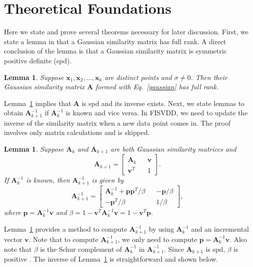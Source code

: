 \documentclass{article}
\newcommand{\eref}[1]{Eq.~\ref{#1}}
\newcommand{\lref}[1]{Lemma~\ref{#1}}
\newtheorem{lemma}[theorem]{Lemma}
\numberwithin{equation}{section}
\begin{document}
\section{Theoretical Foundations}\label{theorems}
Here we state and prove several theorems necessary for later discussion. First, we state a lemma in \citet{smola1998learning} that a Gaussian similarity matrix has full rank. A direct conclusion of the lemma is that a Gaussian similarity matrix is symmetric positive definite (spd).
\begin{lemma}\label{spd}
Suppose $\mathbf{x}_1,\mathbf{x}_2,\ldots,\mathbf{x}_k$ are distinct points and $\sigma\neq0$. Then their Gaussian similarity matrix $\mathbf{A}$ formed with \eref{gaussian} has full rank.
\end{lemma}
\lref{spd} implies that $\mathbf{A}$ is spd and its inverse exists. Next, we state lemmas to obtain $\mathbf{A}_{k+1}^{-1}$ if $\mathbf{A}_{k}^{-1}$ is known and vice versa. In FISVDD, we need to update the inverse of the similarity matrix when a new data point comes in. The proof involves only matrix calculations and is skipped.

\begin{lemma}\label{increinv}
Suppose $\mathbf{A}_k$ and $\mathbf{A}_{k+1}$ are both Gaussian similarity matrices and
\begin{equation}\label{vvec}
\mathbf{A}_{k+1} = \begin{bmatrix}
\mathbf{A}_k && \mathbf{v}\\
\mathbf{v}^T && 1
\end{bmatrix}.
\end{equation}
If $\mathbf{A}_k^{-1}$ is known, then $\mathbf{A}_{k+1}^{-1}$
is given by
\begin{equation}\label{ak+1inv}
\mathbf{A}_{k+1}^{-1} = \begin{bmatrix}
\mathbf{A}_k^{-1} + \mathbf{p}\mathbf{p}^T/\beta && -\mathbf{p}/\beta\\
-\mathbf{p}^T/\beta && 1/\beta
\end{bmatrix},
\end{equation}
where
$\mathbf{p} = \mathbf{A}_k^{-1}\mathbf{v}$ and $\beta = 1 - \mathbf{v}^T\mathbf{A}_k^{-1}\mathbf{v}=1-\mathbf{v}^T\mathbf{p}$.
\end{lemma}

\lref{increinv} provides a method to compute $\mathbf{A}_{k+1}^{-1}$ by using $\mathbf{A}_k^{-1}$ and an incremental vector $\mathbf{v}$. Note that to compute $\mathbf{A}_{k+1}^{-1}$, we only need to compute $\mathbf{p} = \mathbf{A}_k^{-1}\mathbf{v}$. Also note that $\beta$ is the Schur complement \citep{meyer2000matrix} of $\mathbf{A}_k^{-1}$ in $\mathbf{A}_{k+1}^{-1}$. Since $\mathbf{A}_{k+1}$ is spd, $\beta$ is positive \citep{gallier2010schur}. The inverse of \lref{increinv} is straightforward and shown below. 
\end{document}
